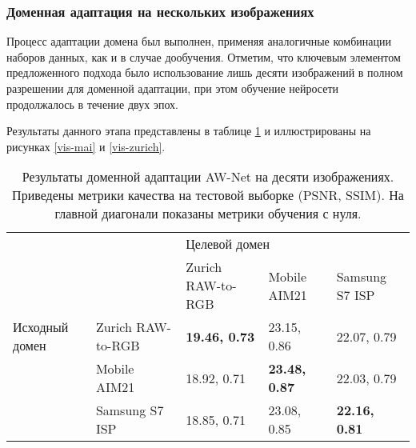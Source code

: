 \subsubsection{Доменная адаптация на нескольких изображениях}


Процесс адаптации домена был выполнен, применяя аналогичные комбинации наборов данных, как и в случае дообучения. Отметим, что ключевым элементом предложенного подхода было использование лишь десяти изображений в полном разрешении для доменной адаптации, при этом обучение нейросети продолжалось в течение двух эпох.

Результаты данного этапа представлены в таблице \ref{tab:da} и иллюстрированы на рисунках \ref{vis-mai} и \ref{vis-zurich}. 

\begin{table}[H]
    \caption{Результаты доменной адаптации AW-Net на десяти изображениях. Приведены метрики качества на тестовой выборке (PSNR, SSIM). На главной диагонали показаны метрики обучения с нуля.}\label{tab:da}
    \begin{tabular}{|p{3cm}p{3cm}|p{3cm}p{3cm}p{3cm}|}
        \hline
        \multicolumn{2}{|p{3cm}|}{\multirow{2}{*}{}}                     & \multicolumn{3}{p{5cm}|}{Целевой домен}                                                                          \\ \cline{3-5} 
        \multicolumn{2}{|p{3cm}|}{}                                      & \multicolumn{1}{p{3cm}|}{Zurich RAW-to-RGB}  & \multicolumn{1}{p{3cm}|}{Mobile AIM21}       & Samsung S7 ISP     \\ \hline
        \multicolumn{1}{|p{3cm}|}{Исходный домен}    & Zurich RAW-to-RGB & \multicolumn{1}{p{3cm}|}{\textbf{19.46, 0.73}} & \multicolumn{1}{p{3cm}|}{23.15, 0.86}        & 22.07, 0.79        \\ \cline{2-5} 
        \multicolumn{1}{|p{3cm}|}{}                  & Mobile AIM21      & \multicolumn{1}{p{3cm}|}{18.92, 0.71}        & \multicolumn{1}{p{3cm}|}{\textbf{23.48, 0.87}} & 22.03, 0.79        \\ \cline{2-5} 
        \multicolumn{1}{|p{3cm}|}{}                  & Samsung S7 ISP    & \multicolumn{1}{p{3cm}|}{18.85, 0.71}        & \multicolumn{1}{p{3cm}|}{23.08, 0.85}        & \textbf{22.16, 0.81} \\ \hline
        \end{tabular}
\end{table}

